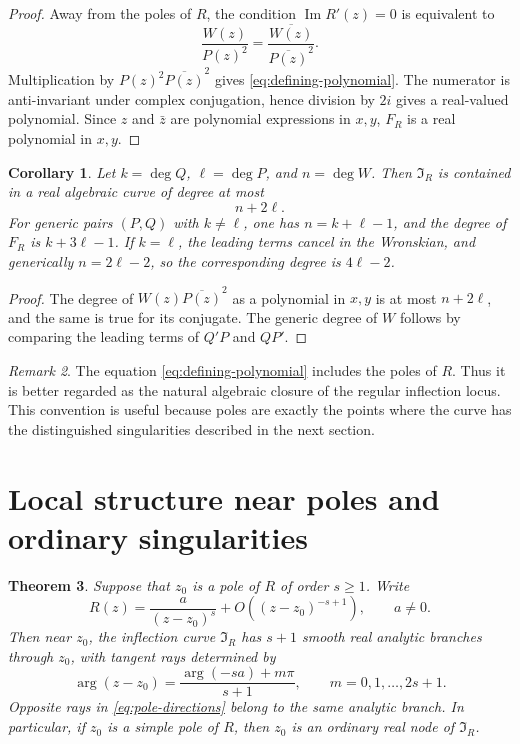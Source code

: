 \documentclass[11pt,reqno]{amsart}
\newtheorem{theorem}{Theorem}[section]
\newtheorem{corollary}[theorem]{Corollary}
\theoremstyle{definition}
\theoremstyle{remark}
\newtheorem{remark}[theorem]{Remark}
\newcommand{\I}{\mathfrak I}
\renewcommand{\Im}{\operatorname{Im}}
\begin{document}
\begin{proof}
Away from the poles of $R$, the condition $\Im R'(z)=0$ is equivalent to
\[
        \frac{W(z)}{P(z)^2}=\frac{\overline{W(z)}}{\overline{P(z)}^2}.
\]
Multiplication by $P(z)^2\overline{P(z)}^2$ gives \eqref{eq:defining-polynomial}.  The numerator is anti-invariant under complex conjugation, hence division by $2i$ gives a real-valued polynomial.  Since $z$ and $\bar z$ are polynomial expressions in $x,y$, $F_R$ is a real polynomial in $x,y$.
\end{proof}

\begin{corollary}\label{cor:degree-bound}
Let $k=\deg Q$, $\ell=\deg P$, and $n=\deg W$.  Then $\I_R$ is contained in a real algebraic curve of degree at most
\[
        n+2\ell.
\]
For generic pairs $(P,Q)$ with $k\ne \ell$, one has $n=k+\ell-1$, and the degree of $F_R$ is $k+3\ell-1$.  If $k=\ell$, the leading terms cancel in the Wronskian, and generically $n=2\ell-2$, so the corresponding degree is $4\ell-2$.
\end{corollary}

\begin{proof}
The degree of $W(z)\overline{P(z)}^2$ as a polynomial in $x,y$ is at most $n+2\ell$, and the same is true for its conjugate.  The generic degree of $W$ follows by comparing the leading terms of $Q'P$ and $QP'$.
\end{proof}

\begin{remark}\label{rem:poles-in-equation}
The equation \eqref{eq:defining-polynomial} includes the poles of $R$.  Thus it is better regarded as the natural algebraic closure of the regular inflection locus.  This convention is useful because poles are exactly the points where the curve has the distinguished singularities described in the next section.
\end{remark}

\section{Local structure near poles and ordinary singularities}

\begin{theorem}\label{thm:local-pole}
Suppose that $z_0$ is a pole of $R$ of order $s\ge1$.  Write
\[
        R(z)=\frac{a}{(z-z_0)^s}+O((z-z_0)^{-s+1}),
        \qquad a\ne0.
\]
Then near $z_0$, the inflection curve $\I_R$ has $s+1$ smooth real analytic branches through $z_0$, with tangent rays determined by
\begin{equation}\label{eq:pole-directions}
        \arg(z-z_0)=\frac{\arg(-sa)+m\pi}{s+1},
        \qquad m=0,1,\ldots,2s+1.
\end{equation}
Opposite rays in \eqref{eq:pole-directions} belong to the same analytic branch.  In particular, if $z_0$ is a simple pole of $R$, then $z_0$ is an ordinary real node of $\I_R$.
\end{theorem}
\end{document}
